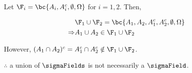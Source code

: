 Let $\F_i = \bc{A_i, A_i^c, \emptyset, \Omega}$ for $i=1,2$.  Then, 

\begin{align*}
  &\F_1 \cup \F_2 = \bc{A_1, A_2, A_1^c, A_2^c, \emptyset, \Omega} \\
  \Rightarrow & A_1 \cup A_2 \in \F_1 \cup \F_2 \\
\end{align*}

However, $(A_1 \cap A_2)^c = A_1^c \cap A_2^c \notin \F_1 \cup \F_2$.

$\therefore$ a union of $\sigmaFields$ is not necessarily a $\sigmaField$.
